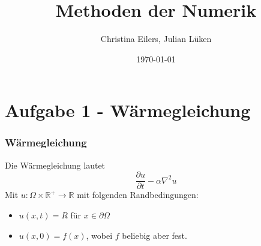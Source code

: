 \documentclass[xcolor = dvipsnames, notheorems, 10pt]{beamer}
\title{Methoden der Numerik}
\date{\today}
\author{Christina Eilers, Julian Lüken}
\institute{Mathematisches Institut Göttingen}
\theoremstyle{definition}
\begin{document}
\begin{frame}
	\maketitle
\end{frame}

\section{Aufgabe 1 - Wärmegleichung}
\begin{frame}
\frametitle{Wärmegleichung}
	Die Wärmegleichung lautet
	$$ \frac{\partial u}{\partial t} - \alpha \nabla^2 u$$
	Mit $u: \Omega \times \mathbb{R}^+ \rightarrow \mathbb{R}$ mit folgenden Randbedingungen:
	\begin{itemize}
		\item $ u(x,t) = R$ für $ x \in \partial \Omega$	
		\item $ u(x,0) = f(x) $, wobei $f$ beliebig aber fest.
	\end{itemize}
\end{frame}
\end{document}
